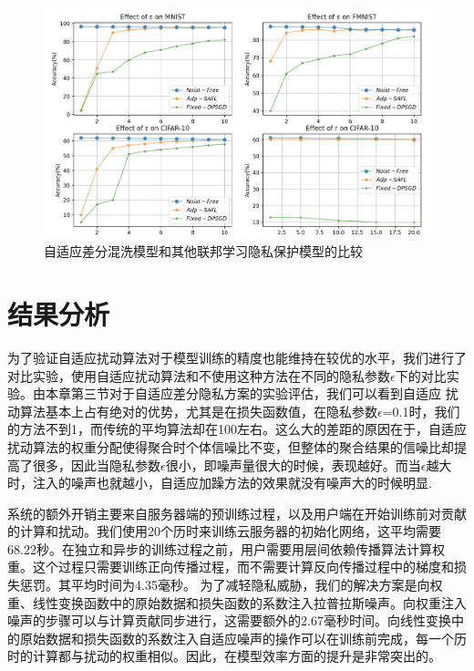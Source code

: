 \begin{figure}[!hbt]
\centering
  	\includegraphics[scale=0.4]{fig2/C5/SA-FL对比实验}%
	\caption{自适应差分混洗模型和其他联邦学习隐私保护模型的比较}
  	\label{自适应差分混洗模型和其他联邦学习隐私保护模型的比较} 
\end{figure}

\section{结果分析}
为了验证自适应扰动算法对于模型训练的精度也能维持在较优的水平，我们进行了对比实验，使用自适应扰动算法和不使用这种方法在不同的隐私参数$\epsilon$下的对比实验。由本章第三节对于自适应差分隐私方案的实验评估，我们可以看到自适应
扰动算法基本上占有绝对的优势，尤其是在损失函数值，在隐私参数$\epsilon$=0.1时，我们的方法不到1，而传统的平均算法却在100左右。这么大的差距的原因在于，自适应扰动算法的权重分配使得聚合时个体信噪比不变，但整体的聚合结果的信噪比却提高了很多，因此当隐私参数$\epsilon$很小，即噪声量很大的时候，表现越好。而当$\epsilon$越大时，注入的噪声也就越小，自适应加躁方法的效果就没有噪声大的时候明显.

系统的额外开销主要来自服务器端的预训练过程，以及用户端在开始训练前对贡献的计算和扰动。我们使用20个历时来训练云服务器的初始化网络，这平均需要68.22秒。在独立和异步的训练过程之前，用户需要用层间依赖传播算法计算权重。这个过程只需要训练正向传播过程，而不需要计算反向传播过程中的梯度和损失惩罚。其平均时间为4.35毫秒。
为了减轻隐私威胁，我们的解决方案是向权重、线性变换函数中的原始数据和损失函数的系数注入拉普拉斯噪声。向权重注入噪声的步骤可以与计算贡献同步进行，这需要额外的2.67毫秒时间。向线性变换中的原始数据和损失函数的系数注入自适应噪声的操作可以在训练前完成，每一个历时的计算都与扰动的权重相似。因此，在模型效率方面的提升是非常突出的。

